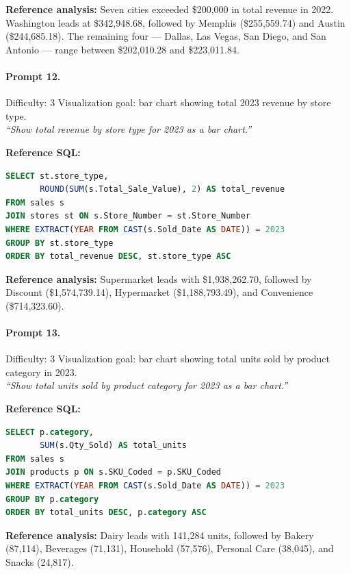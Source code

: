 \textbf{Reference analysis:}
Seven cities exceeded \$200,000 in total revenue in 2022. Washington leads at
\$342,948.68, followed by Memphis (\$255,559.74) and Austin (\$244,685.18). The
remaining four — Dallas, Las Vegas, San Diego, and San Antonio — range between
\$202,010.28 and \$223,011.84.

\bigskip

\paragraph{Prompt 12.}
Difficulty: 3 \quad Visualization goal: bar chart showing total 2023 revenue by store type.\\[2pt]
\textit{``Show total revenue by store type for 2023 as a bar chart.''}

\textbf{Reference SQL:}
\begin{lstlisting}[language=SQL]
SELECT st.store_type,
       ROUND(SUM(s.Total_Sale_Value), 2) AS total_revenue
FROM sales s
JOIN stores st ON s.Store_Number = st.Store_Number
WHERE EXTRACT(YEAR FROM CAST(s.Sold_Date AS DATE)) = 2023
GROUP BY st.store_type
ORDER BY total_revenue DESC, st.store_type ASC
\end{lstlisting}

\textbf{Reference analysis:}
Supermarket leads with \$1,938,262.70, followed by Discount (\$1,574,739.14),
Hypermarket (\$1,188,793.49), and Convenience (\$714,323.60).

\bigskip

\paragraph{Prompt 13.}
Difficulty: 3 \quad Visualization goal: bar chart showing total units sold by product category in 2023.\\[2pt]
\textit{``Show total units sold by product category for 2023 as a bar chart.''}

\textbf{Reference SQL:}
\begin{lstlisting}[language=SQL]
SELECT p.category,
       SUM(s.Qty_Sold) AS total_units
FROM sales s
JOIN products p ON s.SKU_Coded = p.SKU_Coded
WHERE EXTRACT(YEAR FROM CAST(s.Sold_Date AS DATE)) = 2023
GROUP BY p.category
ORDER BY total_units DESC, p.category ASC
\end{lstlisting}

\textbf{Reference analysis:}
Dairy leads with 141,284 units, followed by Bakery (87,114), Beverages (71,131),
Household (57,576), Personal Care (38,045), and Snacks (24,817).

